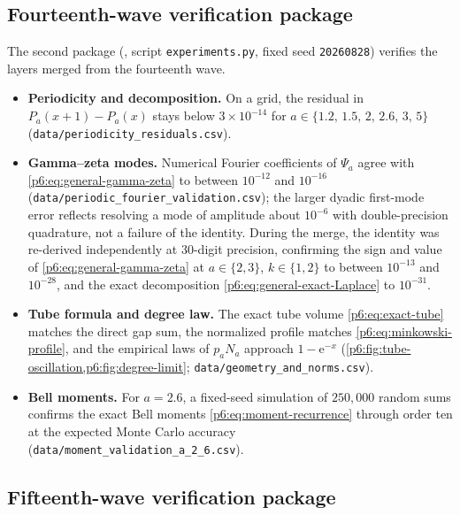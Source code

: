 \documentclass[11pt,oneside]{article}
\numberwithin{equation}{section}
\theoremstyle{definition}
\theoremstyle{remark}
\newcommand{\e}{\mathrm e}
\begin{document}
\subsection{Fourteenth-wave verification package}

The second package (,
script \texttt{experiments.py}, fixed seed \texttt{20260828}) verifies the
layers merged from the fourteenth wave.
\begin{itemize}
\item \textbf{Periodicity and decomposition.}  On a grid, the residual in
$P_a(x+1)-P_a(x)$ stays below $3\times10^{-14}$ for
$a\in\{1.2,\,1.5,\,2,\,2.6,\,3,\,5\}$
(\texttt{data/periodicity\_residuals.csv}).
\item \textbf{Gamma--zeta modes.}  Numerical Fourier coefficients of $\Psi_a$
agree with \eqref{p6:eq:general-gamma-zeta} to between $10^{-12}$ and
$10^{-16}$ (\texttt{data/periodic\_fourier\_validation.csv}); the larger
dyadic first-mode error reflects resolving a mode of amplitude about
$10^{-6}$ with double-precision quadrature, not a failure of the identity.
During the merge, the identity was re-derived independently at
30-digit precision, confirming the sign and value of
\eqref{p6:eq:general-gamma-zeta} at $a\in\{2,3\}$, $k\in\{1,2\}$ to
between $10^{-13}$ and $10^{-28}$, and the exact decomposition
\eqref{p6:eq:general-exact-Laplace} to $10^{-31}$.
\item \textbf{Tube formula and degree law.}  The exact tube volume
\eqref{p6:eq:exact-tube} matches the direct gap sum, the normalized profile
matches \eqref{p6:eq:minkowski-profile}, and the empirical laws of $p_aN_a$
approach $1-\e^{-x}$ (\cref{p6:fig:tube-oscillation,p6:fig:degree-limit};
\texttt{data/geometry\_and\_norms.csv}).
\item \textbf{Bell moments.}  For $a=2.6$, a fixed-seed simulation of
$250{,}000$ random sums confirms the exact Bell moments
\eqref{p6:eq:moment-recurrence} through order ten at the expected Monte Carlo
accuracy (\texttt{data/moment\_validation\_a\_2\_6.csv}).
\end{itemize}

\subsection{Fifteenth-wave verification package}
\end{document}
